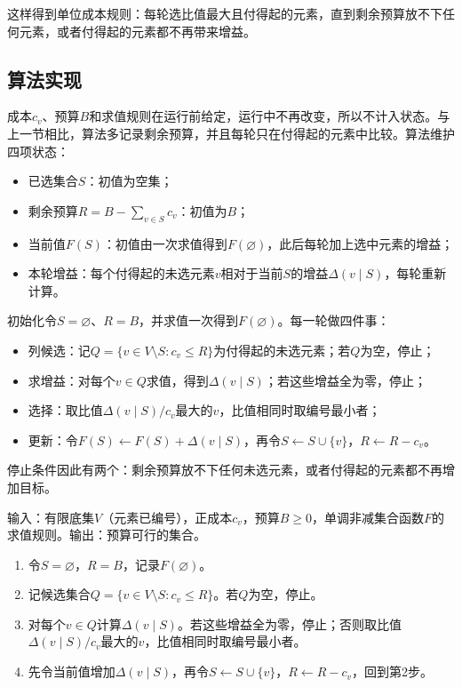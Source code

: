 这样得到单位成本规则：每轮选比值最大且付得起的元素，直到剩余预算放不下任何元素，或者付得起的元素都不再带来增益。

\subsection{算法实现}
\label{sec:graph-setfn-ratio-greedy}

成本$c_v$、预算$B$和求值规则在运行前给定，运行中不再改变，所以不计入状态。与上一节相比，算法多记录剩余预算，并且每轮只在付得起的元素中比较。算法维护四项状态：
\begin{itemize}
  \item 已选集合$S$：初值为空集；
  \item 剩余预算$R=B-\sum_{v\in S}c_v$：初值为$B$；
  \item 当前值$F(S)$：初值由一次求值得到$F(\varnothing)$，此后每轮加上选中元素的增益；
  \item 本轮增益：每个付得起的未选元素$v$相对于当前$S$的增益$\Delta(v\mid S)$，每轮重新计算。
\end{itemize}
初始化令$S=\varnothing$、$R=B$，并求值一次得到$F(\varnothing)$。每一轮做四件事：
\begin{itemize}
  \item 列候选：记$Q=\{v\in V\setminus S:c_v\leq R\}$为付得起的未选元素；若$Q$为空，停止；
  \item 求增益：对每个$v\in Q$求值，得到$\Delta(v\mid S)$；若这些增益全为零，停止；
  \item 选择：取比值$\Delta(v\mid S)/c_v$最大的$v$，比值相同时取编号最小者；
  \item 更新：令$F(S)\gets F(S)+\Delta(v\mid S)$，再令$S\gets S\cup\{v\}$，$R\gets R-c_v$。
\end{itemize}
停止条件因此有两个：剩余预算放不下任何未选元素，或者付得起的元素都不再增加目标。

\begin{algorithm}[预算约束下的单位成本贪心]
\label{alg:graph-setfn-ratio-greedy}
输入：有限底集$V$（元素已编号），正成本$c_v$，预算$B\geq0$，单调非减集合函数$F$的求值规则。输出：预算可行的集合。
\begin{enumerate}
  \item 令$S=\varnothing$，$R=B$，记录$F(\varnothing)$。
  \item 记候选集合$Q=\{v\in V\setminus S:c_v\leq R\}$。若$Q$为空，停止。
  \item 对每个$v\in Q$计算$\Delta(v\mid S)$。若这些增益全为零，停止；否则取比值$\Delta(v\mid S)/c_v$最大的$v$，比值相同时取编号最小者。
  \item 先令当前值增加$\Delta(v\mid S)$，再令$S\leftarrow S\cup\{v\}$，$R\leftarrow R-c_v$，回到第2步。
\end{enumerate}
\end{algorithm}

